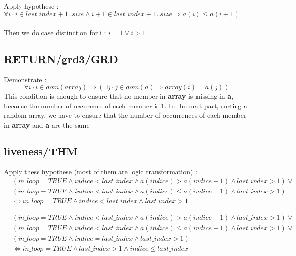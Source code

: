 \paragraph{}
Apply hypothese : \\
$
\forall i \cdot i \in last\_index+1..size \land i+1 \in last\_index+1..size \Rightarrow a(i) \leq a(i+1)
$

\paragraph{}
Then we do case distinction for i : $i=1 \lor i>1$

\subsection{RETURN/grd3/GRD}
Demonstrate : 
$$
\forall i \cdot i \in dom(array) \Rightarrow (\exists j \cdot j \in dom(a) \Rightarrow array(i) = a(j))
$$
This condition is enough to ensure that no member in \textbf{array} is missing in \textbf{a}, because the number of occurence of each member is 1. In the next part, sorting a random array, we have to ensure that the number of occurrences of each member in \textbf{array} and \textbf{a} are the same 

\subsection{liveness/THM}
Apply these hypothese (most of them are logic transformation) :
\begin{align*}
&(in\_loop=TRUE \land indice<last\_index \land a(indice)>a(indice+1) \land last\_index>1) \lor \\
&(in\_loop=TRUE \land indice<last\_index \land a(indice) \leq a(indice+1) \land last\_index>1)  \\
&\Leftrightarrow in\_loop=TRUE \land indice<last\_index \land last\_index>1
\end{align*}

\begin{align*}
&(in\_loop=TRUE \land indice<last\_index \land a(indice)>a(indice+1) \land last\_index>1) \lor \\
&(in\_loop=TRUE \land indice<last\_index \land a(indice) \leq a(indice+1) \land last\_index>1) \lor \\
&(in\_loop=TRUE \land indice=last\_index \land last\_index>1) \\
&\Leftrightarrow in\_loop=TRUE \land last\_index>1 \land indice \leq last\_index
\end{align*}











